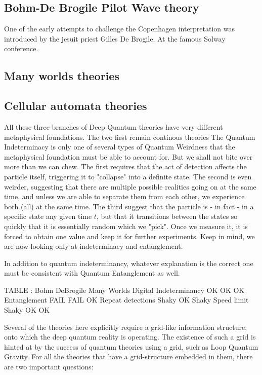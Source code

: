 \documentclass[notitlepage]{report}
\begin{document}
\subsection*{Bohm-De Brogile Pilot Wave theory}
One of the early attempts to challenge the Copenhagen interpretation was introduced by the jesuit priest Gilles De Brogile. At the famous Solway conference. 



\subsection*{Many worlds theories}





\subsection*{Cellular automata theories}




All these three branches of Deep Quantum theories have very different metaphysical foundations. The two first remain continous theories
The Quantum Indeterminacy is only one of several types of Quantum Weirdness that the metaphysical foundation must be able to account for. But we shall not bite over more than we can chew. The first requires that the act of detection affects the particle itself, triggering it to "collapse" into a definite state. The second is even weirder, suggesting that there are multiple possible realities going on at the same time, and unless we are able to separate them from each other, we experience both (all) at the same time.
The third suggest that the particle is - in fact - in a specific state any given time $t$, but that it transitions between the states so quickly that it is essentially random which we "pick". Once we measure it, it is forced to obtain one value and keep it for further experiments. Keep in mind, we are now looking only at indeterminacy and entanglement.

In addition to quantum indeterminancy, whatever explanation is the correct one must be consistent with Quantum Entanglement as well. 

TABLE : 						Bohm DeBrogile		 	Many Worlds	      	Digital
Indeterminancy					OK								OK						OK
Entanglement					FAIL								FAIL						OK
Repeat detections				Shaky							OK						Shaky
Speed limit						Shaky						     OK						OK


Several of the theories here explicitly require a grid-like information structure, onto which the deep quantum reality is operating. The existence of such a grid is hinted at by the success of quantum theories using a grid, such as Loop Quantum Gravity. For all the theories 
that have a grid-structure embedded in them, there are two  important questions: 
\end{document}
